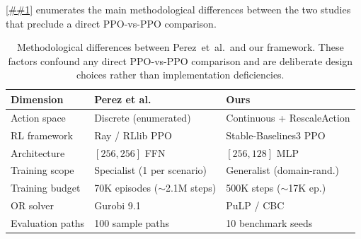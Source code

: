 \documentclass[10pt,a4paper]{article}
\providecommand{\Cref}[1]{\ref{##1}}
\begin{document}
\Cref{tab:methodology_delta} enumerates the main methodological
differences between the two studies that preclude a direct PPO-vs-PPO
comparison.

\begin{table}[!tbp]
\centering
\caption{Methodological differences between Perez~et~al.\ and our
framework.  These factors confound any direct PPO-vs-PPO comparison
and are deliberate design choices rather than implementation
deficiencies.}
\label{tab:methodology_delta}
\small
\renewcommand{\arraystretch}{1.05}
\begin{tabular}{@{} l l l @{}}
\toprule
\textbf{Dimension} & \textbf{Perez et al.} & \textbf{Ours} \\
\midrule
Action space   & Discrete (enumerated) & Continuous + RescaleAction \\
RL framework   & Ray / RLlib PPO       & Stable-Baselines3 PPO \\
Architecture   & $[256, 256]$ FFN      & $[256, 128]$ MLP \\
Training scope & Specialist (1 per scenario) & Generalist (domain-rand.) \\
Training budget & 70K episodes (${\sim}$2.1M steps) & 500K steps (${\sim}$17K ep.) \\
OR solver      & Gurobi 9.1            & PuLP / CBC \\
Evaluation paths & 100 sample paths & 10 benchmark seeds \\
\bottomrule
\end{tabular}
\end{table}
\end{document}
